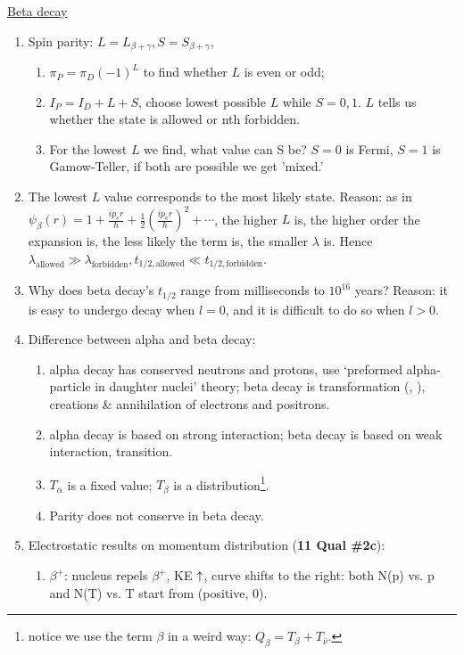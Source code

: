 \documentclass{school-22.101-notes}
\begin{document}
\clearpage
\uline{Beta decay}
\begin{enumerate}
\item Spin parity: $L = L_{\beta + \gamma}, S = S_{\beta + \gamma}$, 
    \begin{enumerate}
    \item $\pi_P = \pi_D (-1)^L$ to find whether $L$ is even or odd;
    \item $I_P = I_D + L + S$, choose lowest possible $L$ while $S = 0,1$. $L$ tells us whether the state is allowed or nth forbidden.
    \item For the lowest $L$ we find, what value can S be? $S=0$ is Fermi, $S=1$ is Gamow-Teller, if both are possible we get 'mixed.' 
    \end{enumerate}
\item The lowest $L$ value corresponds to the most likely state. Reason: as in $\psi_{\beta} (r) = 1 + \frac{i p_e r}{\hbar} + \frac{1}{2} \left( \frac{i p_e r}{\hbar} \right)^2 + \cdots$, the higher $L$ is, the higher order the expansion is, the less likely the term is, the smaller $\lambda$ is. Hence $\lambda_{\mathrm{allowed}} \gg \lambda_{\mathrm{forbidden}}, t_{1/2,\mathrm{allowed}} \ll t_{1/2,\mathrm{forbidden}}$. 
\item Why does beta decay's $t_{1/2}$ range from milliseconds to $10^{16}$ years? Reason: it is easy to undergo decay when $l=0$, and it is difficult to do so when $l>0$.     
\item Difference between alpha and beta decay: 
    \begin{enumerate}
    \item alpha decay has conserved neutrons and protons, use `preformed alpha-particle in daughter nuclei' theory; beta decay is transformation (, ), creations \& annihilation of electrons and positrons.
    \item alpha decay is based on strong interaction; beta decay is based on weak interaction, transition. 
    \item $T_{\alpha}$ is a fixed value; $T_{\beta}$ is a distribution\footnote{notice we use the term $\beta$ in a weird way: $Q_{\beta} = T_{\beta} + T_{\bar{\nu}}$.}. 
    \item Parity does not conserve in beta decay.
    \end{enumerate}
\item Electrostatic results on momentum distribution (\textbf{11 Qual \#2c}): 
    \begin{enumerate}
    \item $\beta^+$: nucleus repels $\beta^+$, KE $\uparrow$, curve shifts to the right: both N(p) vs. p and N(T) vs. T start from (positive, 0). 

\end{enumerate}
\end{enumerate}
\end{document}
